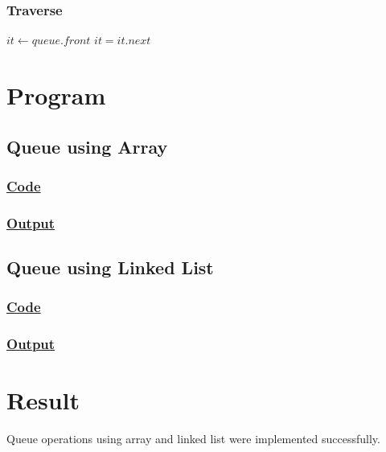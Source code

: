 \subsubsection{Traverse}
{\Large\color{white}
\begin{algorithmic}[1]
			\State {}
		\EndIf

		\State $it \gets queue.front$
			\State {}
			\State $it = it.next$
		\EndWhile
	\EndFunction
\end{algorithmic}
\color{black}}

\section{Program}

\subsection{Queue using Array}

\subsubsection{\underline{Code}}



\subsubsection{\underline{Output}}



\subsection{Queue using Linked List}

\subsubsection{\underline{Code}}



\subsubsection{\underline{Output}}



\vfill

\section{Result}
{\Large\color{white}
Queue operations using array and linked list were implemented successfully.
\color{black}}
\clearpage
